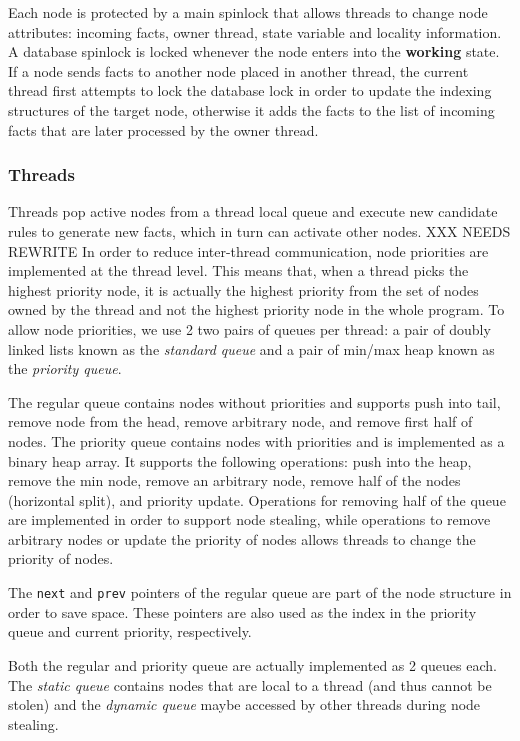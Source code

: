 Each node is protected by a main spinlock that allows threads to change node
attributes: incoming facts, owner thread, state variable and locality information.
A database spinlock is locked whenever the node enters into
the \textbf{working} state. If a node sends facts to another node placed in
another thread, the current thread first attempts to lock the database lock in order to update the
indexing structures of the target node, otherwise it adds the facts to the list of
incoming facts that are later processed by the owner thread.

\subsubsection{Threads}

Threads pop active nodes from a thread local queue and execute new candidate rules to
generate new facts, which in turn can activate other nodes.
XXX NEEDS REWRITE
In order to reduce inter-thread communication, node priorities are implemented
at the thread level. This means that, when a thread picks the highest
priority node, it is actually the highest priority from the set of nodes owned
by the thread and not the highest priority node in the whole program.
To allow node priorities, we use 2 two pairs of queues per thread: a pair of doubly linked
lists known as the \emph{standard queue} and a pair of min/max heap known as the \emph{priority queue}.

The regular queue contains nodes without priorities and
supports push into tail, remove node from the head, remove arbitrary node, and
remove first half of nodes.
The priority queue contains nodes with priorities and is implemented as a binary
heap array. It supports the following operations: push into the heap, remove the min node,
remove an arbitrary node, remove half of the nodes (horizontal split), and
priority update.
Operations for removing half of the queue are implemented in order to support
node stealing, while operations to remove arbitrary nodes or update the
priority of nodes allows threads to change the priority of nodes.

The \texttt{next} and \texttt{prev} pointers of the regular queue are part of
the node structure in order to save space. These pointers are also used as the
index in the priority queue and current priority, respectively.

Both the regular and priority queue are actually implemented as 2 queues each.
The \emph{static queue} contains nodes that are local to a thread (and thus cannot be stolen) and
the \emph{dynamic queue} maybe accessed by other threads during node stealing.


